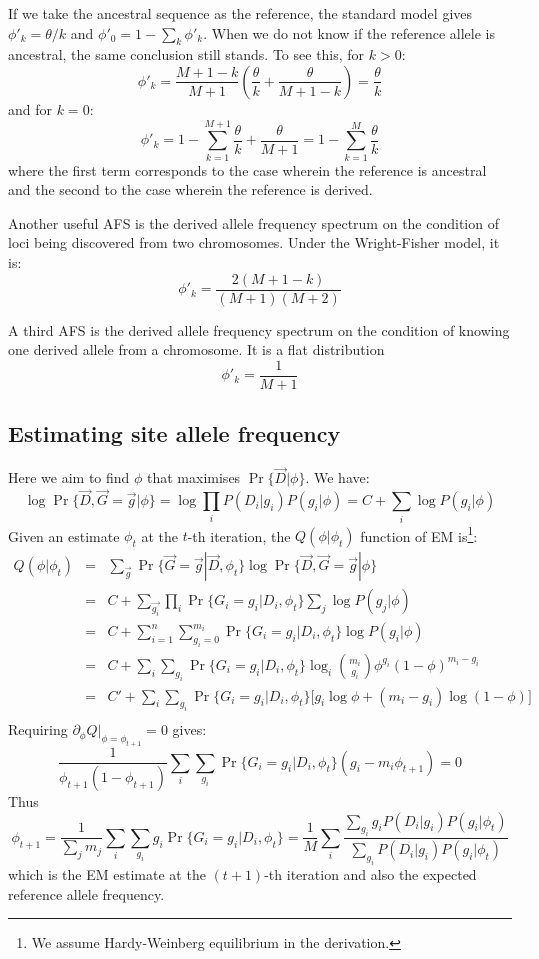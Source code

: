 \documentclass[pdftex,10pt]{book}
\begin{document}
If we take the ancestral sequence as the reference, the standard model
gives $\phi'_k=\theta/k$ and $\phi'_0=1-\sum_k\phi'_k$. When we do not
know if the reference allele is ancestral, the same conclusion still
stands. To see this, for $k>0$:
$$
\phi'_k=\frac{M+1-k}{M+1}\left(\frac{\theta}{k}+\frac{\theta}{M+1-k}\right)=\frac{\theta}{k}
$$
and for $k=0$:
$$
\phi'_k=1-\sum_{k=1}^{M+1}\frac{\theta}{k}+\frac{\theta}{M+1}=1-\sum_{k=1}^{M}\frac{\theta}{k}
$$
where the first term corresponds to the case wherein the reference is
ancestral and the second to the case wherein the reference is derived.

Another useful AFS is the derived allele frequency spectrum on the
condition of loci being discovered from two chromosomes. Under the
Wright-Fisher model, it is:
$$
\phi'_k=\frac{2(M+1-k)}{(M+1)(M+2)}
$$

A third AFS is the derived allele frequency spectrum on the condition of
knowing one derived allele from a chromosome. It is a flat distribution
$$
\phi'_k=\frac{1}{M+1}
$$

\subsection{Estimating site allele frequency}
Here we aim to find $\phi$ that maximises $\Pr\{\vec{D}|\phi\}$. We have:
$$\log \Pr\{\vec{D},\vec{G}=\vec{g}|\phi\}=\log\prod_iP(D_i|g_i)P(g_i|\phi)=C+\sum_i\log P(g_i|\phi)$$
Given an estimate $\phi_t$ at the $t$-th iteration, the $Q(\phi|\phi_t)$
function of EM is\footnote{We assume Hardy-Weinberg equilibrium in the
  derivation.}:
\begin{eqnarray*}
  Q(\phi|\phi_t)&=&\sum_{\vec{g}}\Pr\{\vec{G}=\vec{g}|\vec{D},\phi_t\}\log \Pr\{\vec{D},\vec{G}=\vec{g}|\phi\}\\
  &=&C+\sum_{\vec{g_i}}\prod_i\Pr\{G_i=g_i|D_i,\phi_t\}\sum_j\log P(g_j|\phi)\\
  &=&C+\sum_{i=1}^n\sum_{g_i=0}^{m_i}\Pr\{G_i=g_i|D_i,\phi_t\}\log P(g_i|\phi)\\
  &=&C+\sum_i\sum_{g_i}\Pr\{G_i=g_i|D_i,\phi_t\}\log_i \binom{m_i}{g_i}\phi^{g_i}(1-\phi)^{m_i-g_i}\\
  &=&C'+\sum_i\sum_{g_i}\Pr\{G_i=g_i|D_i,\phi_t\}\Big[g_i\log\phi+(m_i-g_i)\log(1-\phi)\Big]\\
\end{eqnarray*}
Requiring $\partial_{\phi}Q\Big|_{\phi=\phi_{t+1}}=0$ gives:
$$\frac{1}{\phi_{t+1}(1-\phi_{t+1})}\sum_i\sum_{g_i}\Pr\{G_i=g_i|D_i,\phi_t\}(g_i-m_i\phi_{t+1})=0$$
Thus
\begin{equation}\label{equ:freq1}
\phi_{t+1}=\frac{1}{\sum_jm_j}\sum_i\sum_{g_i}g_i\Pr\{G_i=g_i|D_i,\phi_t\}
=\frac{1}{M}\sum_i\frac{\sum_{g_i}g_iP(D_i|g_i)P(g_i|\phi_t)}{\sum_{g_i}P(D_i|g_i)P(g_i|\phi_t)}
\end{equation}
which is the EM estimate at the $(t+1)$-th iteration and also the
expected reference allele frequency.
\end{document}
